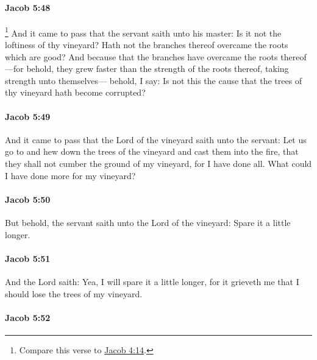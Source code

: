		\paragraph{Jacob 5:48} %
			\label{JACOB-5-48}

				\footnote{%
					Compare this verse to \hyperref[JACOB-4-14]{Jacob 4:14}.
					}%
			And it came to pass that the servant saith unto his master:
			Is it not the loftiness of thy vineyard?
			Hath not the branches thereof overcame the roots which are good?
			And because that the branches have overcame the roots thereof
			---for behold, they grew faster than the strength of the roots thereof,
			taking strength unto themselves---
			behold, I say:
			Is not this the cause
			that the trees of thy vineyard hath become corrupted?

		\paragraph{Jacob 5:49} %
			\label{JACOB-5-49}

			And it came to pass that the Lord of the vineyard saith unto the servant:
			Let us go to and hew down the trees of the vineyard and cast them into the fire,
			that they shall not cumber the ground of my vineyard,
			for I have done all.
			What could I have done more for my vineyard?

		\paragraph{Jacob 5:50} %
			\label{JACOB-5-50}

			But behold, the servant saith unto the Lord of the vineyard:
			Spare it a little longer.

		\paragraph{Jacob 5:51} %
			\label{JACOB-5-51}

			And the Lord saith:
			Yea, I will spare it a little longer,
			for it grieveth me that I should lose the trees of my vineyard.

		\paragraph{Jacob 5:52} %
			\label{JACOB-5-52}

